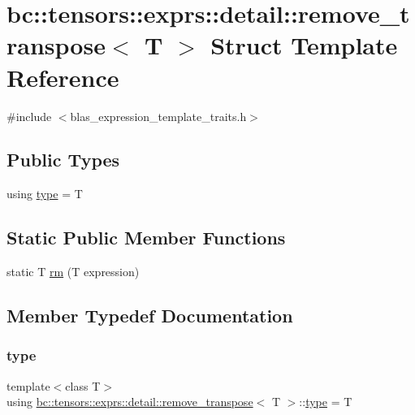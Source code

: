 \hypertarget{structbc_1_1tensors_1_1exprs_1_1detail_1_1remove__transpose}{}\section{bc\+:\+:tensors\+:\+:exprs\+:\+:detail\+:\+:remove\+\_\+transpose$<$ T $>$ Struct Template Reference}
\label{structbc_1_1tensors_1_1exprs_1_1detail_1_1remove__transpose}


{\ttfamily \#include $<$blas\+\_\+expression\+\_\+template\+\_\+traits.\+h$>$}

\subsection*{Public Types}
\begin{DoxyCompactItemize}
\item 
using \hyperlink{structbc_1_1tensors_1_1exprs_1_1detail_1_1remove__transpose_ade20078fe5250bce080d0fd801f450e3}{type} = T
\end{DoxyCompactItemize}
\subsection*{Static Public Member Functions}
\begin{DoxyCompactItemize}
\item 
static T \hyperlink{structbc_1_1tensors_1_1exprs_1_1detail_1_1remove__transpose_ad9cc5239838d4afc5b5c8f889865de58}{rm} (T expression)
\end{DoxyCompactItemize}


\subsection{Member Typedef Documentation}
\mbox{\label{structbc_1_1tensors_1_1exprs_1_1detail_1_1remove__transpose_ade20078fe5250bce080d0fd801f450e3}} 
\subsubsection{\texorpdfstring{type}{type}}
{\footnotesize\ttfamily template$<$class T$>$ \\
using \hyperlink{structbc_1_1tensors_1_1exprs_1_1detail_1_1remove__transpose}{bc\+::tensors\+::exprs\+::detail\+::remove\+\_\+transpose}$<$ T $>$\+::\hyperlink{structbc_1_1tensors_1_1exprs_1_1detail_1_1remove__transpose_ade20078fe5250bce080d0fd801f450e3}{type} =  T}



